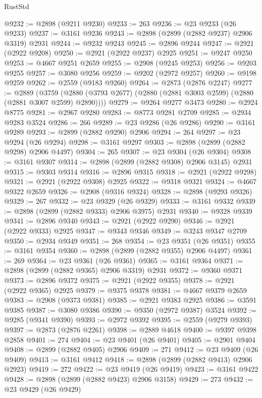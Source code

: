 \begin{lexlean}{RustStd}
\begin{coremodule}
@9232 := @2898 (@9211 @9230)
@9233 := 263
@9236 := @23 @9233 (@26 @9233)
@9237 := @3161 @9236
@9243 := @2898 (@2899 (@2882 @9237) @2906 @3319) @2931
@9244 := @9232 @9243
@9245 := @2896 @9244
@9247 := @2921 (@2922 @9208)
@9250 := @2921 (@2922 @9237) @2925
@9251 := @9247 @9250
@9253 := @4667 @9251 @2659
@9255 := @2908 (@9245 @9253)
@9256 := @9203 @9255
@9257 := @3080 @9256
@9259 := @9202 (@2972 @9257)
@9260 := @9198 @9259
@9262 := @2559 (@9183 @9260)
@9264 := @2873 (@2876 @2247)
@9277 := @2889
    (@3759 (@2880 (@3793 @2677) (@2880 (@2881 @3003 @2599) (@2880 (@2881 @3007 @2599) @2890))))
@9279 := @9264 @9277 @3473
@9280 := @2924 @8775
@9281 := @2967 @9280
@9283 := @8773 @9281 @2709
@9285 := @2934 @9283 @3524
@9286 := 266
@9289 := @23 @9286 (@26 @9286)
@9290 := @3161 @9289
@9293 := @2899 (@2882 @9290) @2906
@9294 := 264
@9297 := @23 @9294 (@26 @9294)
@9298 := @3161 @9297
@9303 := @2898 (@2899 (@2882 @9298) @2906 @4497)
@9304 := 265
@9307 := @23 @9304 (@26 @9304)
@9308 := @3161 @9307
@9314 := @2898 (@2899 (@2882 @9308) @2906 @3145) @2931
@9315 := @9303 @9314
@9316 := @2896 @9315
@9318 := @2921 (@2922 @9298)
@9321 := @2921 (@2922 @9308) @2925
@9322 := @9318 @9321
@9324 := @4667 @9322 @2659
@9326 := @2908 (@9316 @9324)
@9328 := @2898 (@9293 @9326)
@9329 := 267
@9332 := @23 @9329 (@26 @9329)
@9333 := @3161 @9332
@9339 := @2898 (@2899 (@2882 @9333) @2906 @3975) @2931
@9340 := @9328 @9339
@9341 := @2896 @9340
@9343 := @2921 (@2922 @9290)
@9346 := @2921 (@2922 @9333) @2925
@9347 := @9343 @9346
@9349 := @3243 @9347 @2709
@9350 := @2934 @9349
@9351 := 268
@9354 := @23 @9351 (@26 @9351)
@9355 := @3161 @9354
@9360 := @2898 (@2899 (@2882 @9355) @2906 @4497)
@9361 := 269
@9364 := @23 @9361 (@26 @9361)
@9365 := @3161 @9364
@9371 := @2898 (@2899 (@2882 @9365) @2906 @3319) @2931
@9372 := @9360 @9371
@9373 := @2896 @9372
@9375 := @2921 (@2922 @9355)
@9378 := @2921 (@2922 @9365) @2925
@9379 := @9375 @9378
@9381 := @4667 @9379 @2659
@9383 := @2908 (@9373 @9381)
@9385 := @2921 @9383 @2925
@9386 := @3591 @9385
@9387 := @3080 @9386
@9390 := @9350 (@2972 @9387) @3524
@9392 := @9285 (@9341 @9390)
@9393 := @2972 @9392
@9395 := @2559 (@9279 @9393)
@9397 := @2873 (@2876 @2261)
@9398 := @2889 @4618
@9400 := @9397 @9398 @2858
@9401 := 274
@9404 := @23 @9401 (@26 @9401)
@9405 := @2901 @9404
@9408 := @2899 (@2882 @9405) @2906
@9409 := 271
@9412 := @23 @9409 (@26 @9409)
@9413 := @3161 @9412
@9418 := @2898 (@2899 (@2882 @9413) @2906 @2923)
@9419 := 272
@9422 := @23 @9419 (@26 @9419)
@9423 := @3161 @9422
@9428 := @2898 (@2899 (@2882 @9423) @2906 @3158)
@9429 := 273
@9432 := @23 @9429 (@26 @9429)

\end{coremodule}
\end{lexlean}
